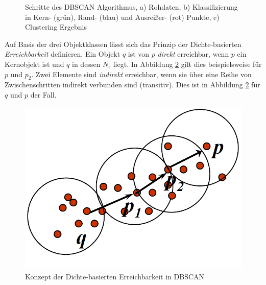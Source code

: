 \begin{figure}[H]
    \centering
    \caption[Schritte des DBSCAN Algorithmus]
            {Schritte des DBSCAN Algorithmus, a) Rohdaten, b) Klassifizierung in Kern- (grün), Rand- (blau) und Ausreißer- (rot) Punkte, c) Clustering Ergebnis \cite[]{Gao2012}}
    \label{fig:grund_dbscan_clustering}
\end{figure}

Auf Basis der drei Objektklassen lässt sich das Prinzip der Dichte-basierten \textit{Erreichbarkeit} definieren.
Ein Objekt $q$ ist von $p$ \textit{direkt} erreichbar, wenn $p$ ein Kernobjekt ist und $q$ in dessen $N_{\epsilon}$ liegt.
In Abbildung \ref{fig:grund_dbscan_reachability} gilt dies beispielsweise für $p$ und $p_2$.
Zwei Elemente sind \textit{indirekt} erreichbar, wenn sie über eine Reihe von Zwischenschritten indirekt
verbunden sind (transitiv). Dies ist in Abbildung \ref{fig:grund_dbscan_reachability} für $q$ und $p$ der Fall.

\begin{figure}[H]
    \centering
    \includegraphics[width=0.32\linewidth]{resources/img/grundlagen/clustering_dbscan/reachability}
    \caption[Konzept Erreichbarkeit in DBSCAN]
            {Konzept der Dichte-basierten Erreichbarkeit in DBSCAN \cite[]{Gao2012}}
    \label{fig:grund_dbscan_reachability}
\end{figure}

